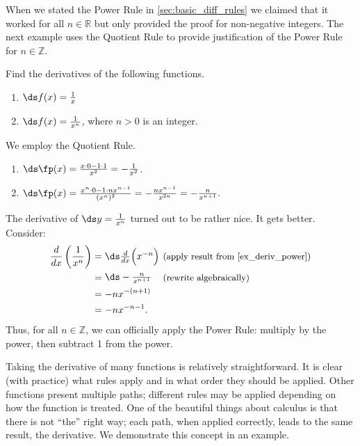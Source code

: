 When we stated the Power Rule in \autoref{sec:basic_diff_rules} we claimed that it worked for all $n\in\mathbb{R}$ but only provided the proof for non-negative integers. The next example uses the Quotient Rule to provide justification of the Power Rule for  $n\in\mathbb{Z}$.

\begin{example}\label{ex_deriv_power}
Find the derivatives of the following functions. 
\begin{enumerate}
	\item	$\ds f(x) = \frac{1}{x}$
	\item	$\ds f(x)= \frac{1}{x^n}$, where $n>0$ is an integer.
\end{enumerate}
\solution
We employ the Quotient Rule.
\begin{enumerate}
	\item	$\ds \fp(x) = \frac{x\cdot 0 - 1\cdot 1}{x^2} = -\frac{1}{x^2}$.
	\item	$\ds \fp(x) = \frac{x^n\cdot 0 - 1\cdot nx^{n-1}}{(x^n)^2} = -\frac{nx^{n-1}}{x^{2n}} = -\frac{n}{x^{n+1}}.$
\end{enumerate}
\end{example}

The derivative of $\ds y=\frac{1}{x^n}$ turned out to be rather nice. It gets better. Consider:
\begin{align*}
	\frac{d}{dx}\left(\frac{1}{x^n}\right)
	&= \parbox{60pt}{$\ds\frac{d}{dx}\Bigl(x^{-n}\Bigr)$}
	\text{\small (apply result from \autoref{ex_deriv_power})}\\
	&= \parbox{60pt}{$\ds-\frac{n}{x^{n+1}}$}\text{\small (rewrite algebraically)} \\
	&= -nx^{-(n+1)} \\
	&= -nx^{-n-1}.
\end{align*}
Thus, for all $n\in\mathbb{Z}$, we can officially apply the Power Rule: multiply by the power, then subtract 1 from the power.

Taking the derivative of many functions is relatively straightforward. It is clear (with practice) what rules apply and in what order they should be applied. Other functions present multiple paths; different rules may be applied depending on how the function is treated. One of the beautiful things about calculus is that there is not ``the'' right way; each path, when applied correctly, leads to the same result, the derivative. We demonstrate this concept in an example.

